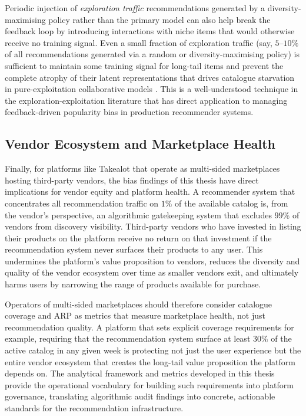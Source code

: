 \documentclass[11pt,a4paper]{report}
\begin{document}
Periodic injection of \emph{exploration traffic} recommendations generated by a diversity-maximising policy rather than the primary model can also help break the feedback loop by introducing interactions with niche items that would otherwise receive no training signal. Even a small fraction of exploration traffic (say, $5$--$10\%$ of all recommendations generated via a random or diversity-maximising policy) is sufficient to maintain some training signal for long-tail items and prevent the complete atrophy of their latent representations that drives catalogue starvation in pure-exploitation collaborative models \citep{jiang2019degenerate}. This is a well-understood technique in the exploration-exploitation literature that has direct application to managing feedback-driven popularity bias in production recommender systems.

\subsection*{Vendor Ecosystem and Marketplace Health}

Finally, for platforms like Takealot that operate as multi-sided marketplaces hosting third-party vendors, the bias findings of this thesis have direct implications for vendor equity and platform health. A recommender system that concentrates all recommendation traffic on $1\%$ of the available catalog is, from the vendor's perspective, an algorithmic gatekeeping system that excludes $99\%$ of vendors from discovery visibility. Third-party vendors who have invested in listing their products on the platform receive no return on that investment if the recommendation system never surfaces their products to any user. This undermines the platform's value proposition to vendors, reduces the diversity and quality of the vendor ecosystem over time as smaller vendors exit, and ultimately harms users by narrowing the range of products available for purchase.

Operators of multi-sided marketplaces should therefore consider catalogue coverage and ARP as metrics that measure marketplace health, not just recommendation quality. A platform that sets explicit coverage requirements for example, requiring that the recommendation system surface at least $30\%$ of the active catalog in any given week is protecting not just the user experience but the entire vendor ecosystem that creates the long-tail value proposition the platform depends on. The analytical framework and metrics developed in this thesis provide the operational vocabulary for building such requirements into platform governance, translating algorithmic audit findings into concrete, actionable standards for the recommendation infrastructure.
\end{document}

